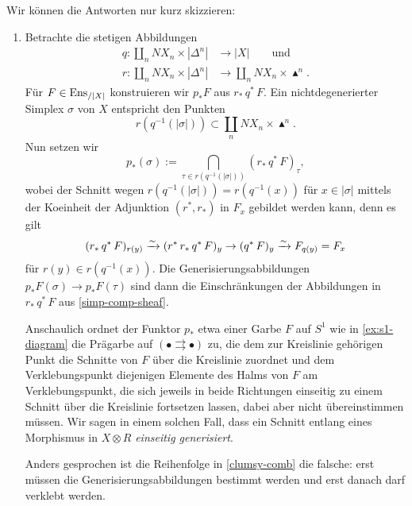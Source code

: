 Wir können die Antworten nur kurz skizzieren:
\begin{enumerate}
\item Betrachte die stetigen Abbildungen
  \begin{align*}
    q: \coprod_n NX_n \times |\Delta^n| &\to |X| \qquad \text{und} \\
    r: \coprod_n NX_n \times |\Delta^n| &\to
    \coprod_n NX_n \times \blacktriangle^n.
  \end{align*}
  Für $F \in \operatorname{Ens}_{/|X|}$ konstruieren wir $p_*F$ aus $r_* \,q^*\,
  F$. Ein nichtdegenerierter Simplex $\sigma$ von $X$ entspricht den
  Punkten
  \[ r(q^{-1}(|\sigma|)) \subset \coprod_n NX_n \times \blacktriangle^n.
  \]
  Nun setzen wir
  \[ p_*(\sigma) := \bigcap_{\tau \in r(q^{-1}(|\sigma|))} (r_*\,q^*\,F)_\tau , \]
  wobei der Schnitt wegen $r(q^{-1}(|\sigma|)) = r(q^{-1}(x))$ für $x
  \in |\sigma|$ mittels der Koeinheit der Adjunktion $(r^*, r_*)$ in
  $F_x$ gebildet werden kann, denn es gilt
  \[ (r_*\,q^*\,F)_{r(y)} \xrightarrow[]{\sim} (r^*\,r_*\,q^*\,F)_y
  \to (q^*\, F)_y \xrightarrow[]{\sim} F_{q(y)} = F_x
  \]
  für $r(y) \in r(q^{-1}(x))$. Die Generisierungsabbildungen
  $p_*F(\sigma) \to p_*F(\tau)$ sind dann die Einschränkungen der
  Abbildungen in $r_* \,q^*\, F$ aus \ref{simp-comp-sheaf}.

  Anschaulich ordnet der Funktor $p_*$ etwa einer Garbe $F$ auf $S^1$
  wie in \ref{ex:s1-diagram} die Prägarbe auf $(\bullet
  \rightrightarrows \bullet)$ zu, die dem zur Kreislinie gehörigen
  Punkt die Schnitte von $F$ über die Kreislinie zuordnet und dem
  Verklebungspunkt diejenigen Elemente des Halms von $F$ am
  Verklebungspunkt, die sich jeweils in beide Richtungen einseitig zu
  einem Schnitt über die Kreislinie fortsetzen lassen, dabei aber
  nicht übereinstimmen müssen. Wir sagen in einem solchen Fall, dass
  ein Schnitt entlang eines Morphismus in $X \otimes R$
  \emph{einseitig generisiert}.

  Anders gesprochen ist die Reihenfolge in \ref{clumsy-comb} die
  falsche: erst müssen die Generisierungsabbildungen bestimmt werden
  und erst danach darf verklebt werden.


\end{enumerate}
